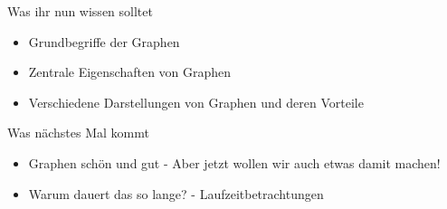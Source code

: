 \begin{frame}	
	\begin{block}{Was ihr nun wissen solltet}
		\begin{itemize}
			\item Grundbegriffe der Graphen
			\item Zentrale Eigenschaften von Graphen
			\item Verschiedene Darstellungen von Graphen und deren Vorteile
		\end{itemize}
	\end{block}
	
	\begin{block}{Was nächstes Mal kommt}
		\begin{itemize}
			\item Graphen schön und gut - Aber jetzt wollen wir auch etwas damit machen!
			\item Warum dauert das so lange? - Laufzeitbetrachtungen
		\end{itemize}
	\end{block}
\end{frame}


\slideThanks

